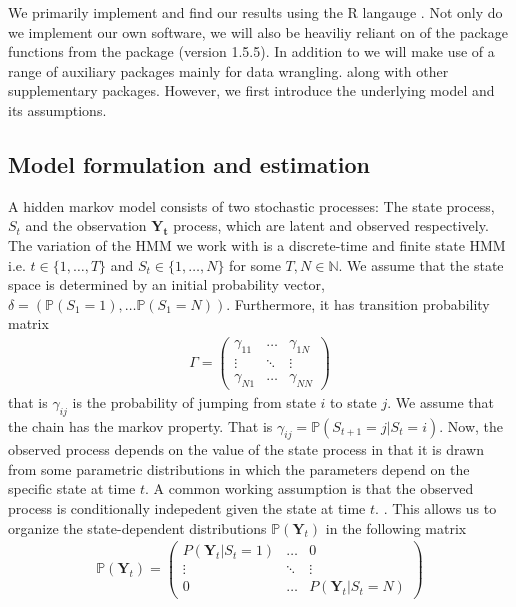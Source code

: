 We primarily implement and find our results using the R langauge \cite{RLang}.
Not only do we implement our own software, we will also be heaviliy reliant on of the package functions from the package  \cite{momentuHMM} (version 1.5.5). In addition to  we will make use of a range of auxiliary packages mainly for data wrangling.\cite{tidyverse}\cite{Rcpp} along with other supplementary packages.\cite{gridExtra}\cite{microbenchmark}\cite{ggthemes}\cite{ggmap}\cite{mapview} However, we first introduce the underlying model and its assumptions.
\subsection*{Model formulation and estimation}
A hidden markov model consists of two stochastic processes: The state process, $S_t$ and the observation $\mathbf{Y_t}$ process, which are latent and observed respectively. The variation of the HMM we work with is a discrete-time and finite state HMM i.e. $t\in\{1,\dots , T\}$ and $S_t\in\{1,\dots , N\}$ for some $T, N\in\mathbb{N}$. We assume that the state space is determined by an initial probability vector, $\delta = \left(\mathbb{P}(S_1 = 1),\dots \mathbb{P}(S_1 = N)\right)$. Furthermore, it has transition probability matrix
\begin{align}
    \Gamma = \begin{pmatrix}
        \gamma_{11} & \dots &  \gamma_{1N} \\
        \vdots & \ddots & \vdots \\
        \gamma_{N1} & \dots & \gamma_{NN}
    \end{pmatrix} \label{Gamma1}
\end{align}
that is $\gamma_{ij}$ is the probability of jumping from state $i$ to state $j$. We assume that the chain has the markov property. That is $\gamma_{ij} = \mathbb{P}\left(S_{t+1} = j | S_t = i\right)$. Now, the observed process depends on the value of the state process in that it is drawn from some parametric distributions in which the parameters depend on the specific state at time $t$.
A common working assumption is that the observed process is conditionally indepedent given the state at time $t$. 
\cite{UncoveringEcologicalState}. This allows us to organize the state-dependent distributions $\mathbb{P}(\mathbf{Y}_t)$ in the following matrix
\begin{align}
    \mathbb{P}(\mathbf{Y}_t) = \begin{pmatrix}
        P(\mathbf{Y}_t | S_t = 1) & \dots &  0 \\
        \vdots & \ddots & \vdots \\
        0 & \dots & P(\mathbf{Y}_t | S_t = N)
    \end{pmatrix}  
\end{align}

